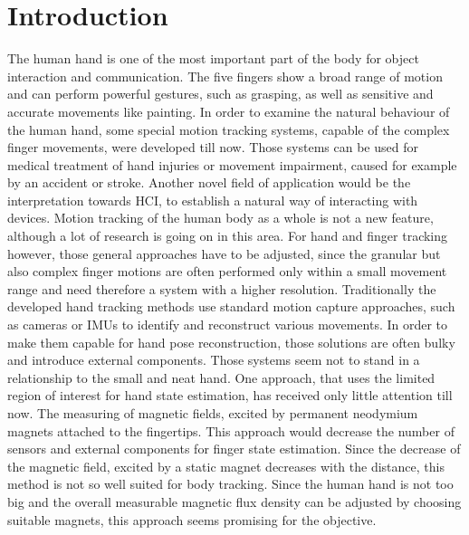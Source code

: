 
\lhead[\chaptername~\thechapter]{\rightmark}


\rhead[\leftmark]{}


\lfoot[\thepage]{}


\cfoot{}


\rfoot[]{\thepage}


\chapter{Introduction}

The human hand is one of the most important part of the body for object interaction and communication. The five fingers show a broad range of motion and can perform powerful gestures, such as grasping, as well as sensitive and accurate movements like painting. In order to examine the natural behaviour of the human hand, some special motion tracking systems, capable of the complex finger movements, were developed till now. Those systems can be used for medical treatment of hand injuries or movement impairment, caused for example by an accident or stroke. Another novel field of application would be the interpretation towards \ac{HCI}, to establish a natural way of interacting with devices. Motion tracking of the human body as a whole is not a new feature, although a lot of research is going on in this area. For hand and finger tracking however, those general approaches have to be adjusted, since the granular but also complex finger motions are often performed only within a small movement range and need therefore a system with a higher resolution. Traditionally the developed hand tracking methods use standard motion capture approaches, such as cameras or \acp{IMU} to identify and reconstruct various movements. In order to make them capable for hand pose reconstruction, those solutions are often bulky and introduce external components. Those systems seem not to stand in a relationship to the small and neat hand. One approach, that uses the limited region of interest for hand state estimation, has received only little attention till now. The measuring of magnetic fields, excited by permanent neodymium magnets attached to the fingertips. This approach would decrease the number of sensors and external components for finger state estimation. Since the decrease of the magnetic field, excited by a static magnet decreases with the distance, this method is not so well suited for body tracking. Since the human hand is not too big and the overall measurable magnetic flux density can be adjusted by choosing suitable magnets, this approach seems promising for the objective.

